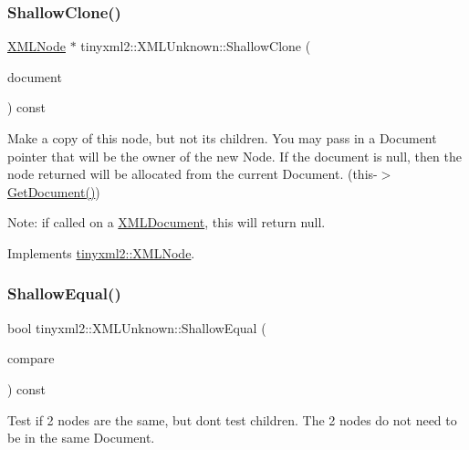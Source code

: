 \subsubsection{\texorpdfstring{Shallow\+Clone()}{ShallowClone()}}
{\footnotesize\ttfamily \mbox{\hyperlink{classtinyxml2_1_1_x_m_l_node}{X\+M\+L\+Node}} $\ast$ tinyxml2\+::\+X\+M\+L\+Unknown\+::\+Shallow\+Clone (\begin{DoxyParamCaption}\item[{\mbox{\hyperlink{classtinyxml2_1_1_x_m_l_document}{X\+M\+L\+Document}} $\ast$}]{document }\end{DoxyParamCaption}) const\hspace{0.3cm}{\ttfamily [virtual]}}

Make a copy of this node, but not its children. You may pass in a Document pointer that will be the owner of the new Node. If the \textquotesingle{}document\textquotesingle{} is null, then the node returned will be allocated from the current Document. (this-\/$>$\mbox{\hyperlink{classtinyxml2_1_1_x_m_l_node_af343d1ef0b45c0020e62d784d7e67a68}{Get\+Document()}})

Note\+: if called on a \mbox{\hyperlink{classtinyxml2_1_1_x_m_l_document}{X\+M\+L\+Document}}, this will return null. 

Implements \mbox{\hyperlink{classtinyxml2_1_1_x_m_l_node_a8402cbd3129d20e9e6024bbcc0531283}{tinyxml2\+::\+X\+M\+L\+Node}}.

\mbox{\label{classtinyxml2_1_1_x_m_l_unknown_ac46767cd721d666e690a6231dfb618d1}} 
\subsubsection{\texorpdfstring{Shallow\+Equal()}{ShallowEqual()}}
{\footnotesize\ttfamily bool tinyxml2\+::\+X\+M\+L\+Unknown\+::\+Shallow\+Equal (\begin{DoxyParamCaption}\item[{const \mbox{\hyperlink{classtinyxml2_1_1_x_m_l_node}{X\+M\+L\+Node}} $\ast$}]{compare }\end{DoxyParamCaption}) const\hspace{0.3cm}{\ttfamily [virtual]}}

Test if 2 nodes are the same, but don\textquotesingle{}t test children. The 2 nodes do not need to be in the same Document.

